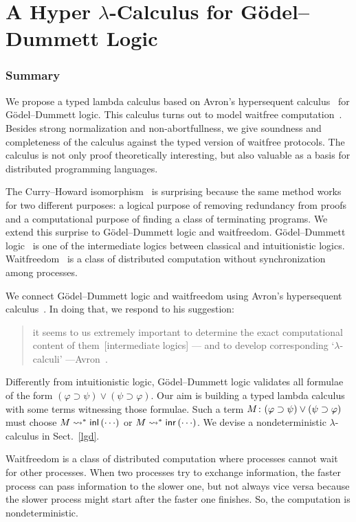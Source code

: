 \chapter{A Hyper $\lambda$-Calculus for G\"odel--Dummett Logic}

\subsection{Summary}

We propose a typed lambda calculus based on Avron's hypersequent
calculus~\citep{avron91} for G\"odel--Dummett logic.  This calculus turns out to model
waitfree computation~\citep{Herlihy88,Saks:1993vq}.
Besides strong normalization and non-abortfullness,
we give soundness and completeness of
the calculus against the typed version of waitfree protocols.
The calculus is not only proof theoretically interesting,
but also valuable as a basis for distributed programming languages.

The Curry--Howard isomorphism~\cite{curryhoward} is surprising because the same
method works for two different purposes: a logical purpose of
removing redundancy from proofs and a computational purpose of finding a
class of terminating programs.
We extend
this surprise to G\"odel--Dummett logic and
waitfreedom.
G\"odel--Dummett logic~\cite{dummett59}
is one of the intermediate logics
between classical and intuitionistic logics.
Waitfreedom~\cite{Herlihy88,Saks:1993vq} is a class of distributed
computation without synchronization among processes.

We connect G\"odel--Dummett logic and waitfreedom using
Avron's hypersequent calculus~\cite{avron91}.
In doing that, we respond to his suggestion:
\begin{quote}
it seems to us extremely important to determine the exact
       computational content of them~[intermediate logics] ---
       and {to develop corresponding `$\lambda$-calculi'}
       ---Avron~\cite{avron91}.
\end{quote}
Differently from intuitionistic logic, G\"odel--Dummett logic validates
all formulae of the form
 $(\varphi\supset\psi)\vee(\psi\supset\varphi)$.
Our aim is building a typed lambda calculus
with some terms witnessing those formulae.
Such a term
${M} \colon{(\varphi\supset\psi)\vee(\psi\supset\varphi)}$ must choose
$M\rightsquigarrow^\ast \mathsf{inl}\left({\cdots}\right)$ or $M\rightsquigarrow^\ast \mathsf{inr}\left({\cdots}\right)$.
We devise a nondeterministic $\lambda$-calculus in Sect.~\ref{lgd}.

Waitfreedom is a class of distributed computation where
processes cannot wait for other processes.  When two processes try to
exchange information, the faster process can pass information to the
slower one, but not always vice versa because the slower process might
start after the faster one finishes.
So, the computation is nondeterministic.

